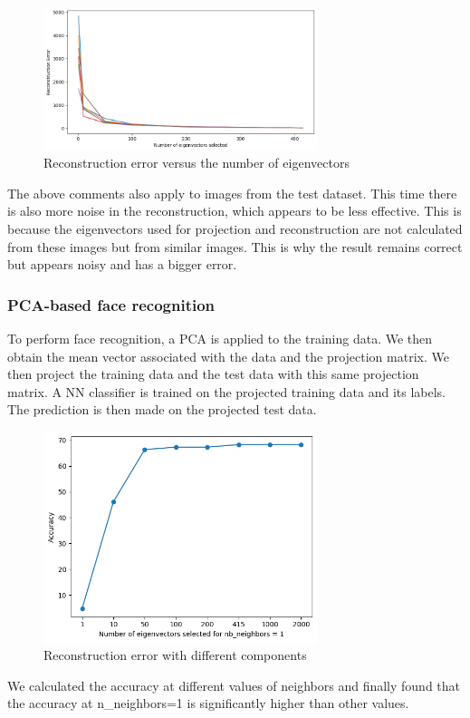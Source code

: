 \begin{figure}[H]
	\centering
	\includegraphics[width=8.0cm]{./Ressources/Reconstruction_error.png}
	\caption{Reconstruction error versus the number of eigenvectors}
	\label{fig:rect_result}
\end{figure}

The above comments also apply to images from the test dataset. This time there is also more noise in the reconstruction, which appears to be less effective. This is because the eigenvectors used for projection and reconstruction are not calculated from these images but from similar images. This is why the result remains correct but appears noisy and has a bigger error.

\subsubsection{PCA-based face recognition}

To perform face recognition, a PCA is applied to the training data. We then obtain the mean vector associated with the data and the projection matrix. We then project the training data and the test data with this same projection matrix. A NN classifier is trained on the projected training data and its labels. The prediction is then made on the projected test data.


\begin{figure}[h]
	\centering
	\includegraphics[width=8.0cm]{./Ressources/accuracy_1neighbors.png}
	\caption{Reconstruction error with different components}
	\label{fig:n_num}
\end{figure}
We calculated the accuracy at different values of neighbors and finally found that the accuracy at n\_neighbors=1 is significantly higher than other values.

